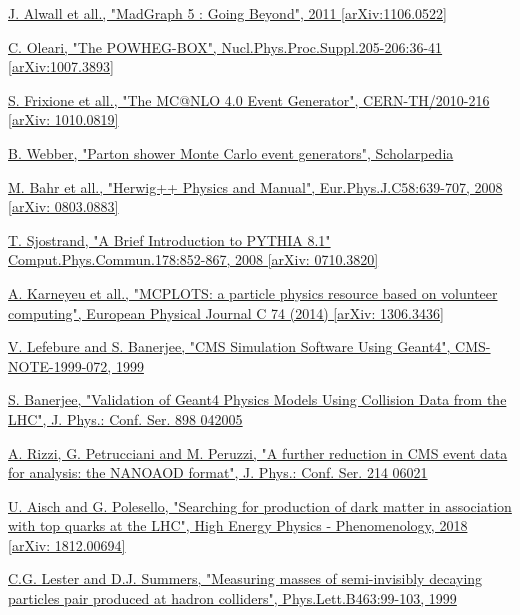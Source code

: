 \documentclass[a4paper, 10pt, openright]{report}
\begin{document}
\begin{thebibliography}{1}
\href{https://arxiv.org/abs/1106.0522}{J. Alwall et all.,
"MadGraph 5 : Going Beyond",
2011 [arXiv:1106.0522]}

\href{https://arxiv.org/abs/1007.3893}{C. Oleari,
"The POWHEG-BOX",
Nucl.Phys.Proc.Suppl.205-206:36-41 [arXiv:1007.3893]}

\href{https://arxiv.org/abs/1010.0819}{S. Frixione et all.,
"The MC@NLO 4.0 Event Generator",
CERN-TH/2010-216 [arXiv: 1010.0819]}

\href{http://www.scholarpedia.org/article/Parton_shower_Monte_Carlo_event_generators}{B. Webber,
"Parton shower Monte Carlo event generators",
Scholarpedia}

\href{https://arxiv.org/abs/0803.0883}{M. Bahr et all.,
"Herwig++ Physics and Manual",
Eur.Phys.J.C58:639-707, 2008 [arXiv: 0803.0883]}

\href{https://arxiv.org/abs/0710.3820}{T. Sjostrand,
"A Brief Introduction to PYTHIA 8.1"
Comput.Phys.Commun.178:852-867, 2008 [arXiv: 0710.3820]}

\href{https://arxiv.org/abs/1306.3436}{A. Karneyeu et all.,
"MCPLOTS: a particle physics resource based on volunteer computing",
European Physical Journal C 74 (2014) [arXiv: 1306.3436]}

\href{http://inspirehep.net/record/876352}{V. Lefebure and S. Banerjee,
"CMS Simulation Software Using Geant4",
CMS-NOTE-1999-072, 1999}

\href{https://iopscience.iop.org/article/10.1088/1742-6596/898/4/042005/pdf}{S. Banerjee,
"Validation of Geant4 Physics Models Using Collision Data from the LHC",
J. Phys.: Conf. Ser. 898 042005}

\href{https://www.researchgate.net/publication/335864848_A_further_reduction_in_CMS_event_data_for_analysis_the_NANOAOD_format}{A. Rizzi, G. Petrucciani and M. Peruzzi,
"A further reduction in CMS event data for analysis: the NANOAOD format",
J. Phys.: Conf. Ser. 214 06021}

\href{https://arxiv.org/abs/1812.00694}{U. Aisch and G. Polesello,
"Searching for production of dark matter in association with top quarks at the LHC",
High Energy Physics - Phenomenology, 2018 [arXiv: 1812.00694]}

\href{https://arxiv.org/abs/hep-ph/9906349}{C.G. Lester and D.J. Summers,
"Measuring masses of semi-invisibly decaying particles pair produced at hadron colliders",
Phys.Lett.B463:99-103, 1999}


\end{thebibliography}
\end{document}
